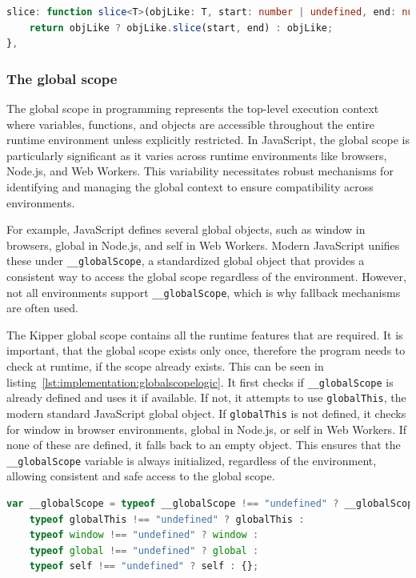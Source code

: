\begin{lstlisting}[language=TypeScript,caption=Slice in the target language TypeScript,label=lst:implementation:slicegenerated]
slice: function slice<T>(objLike: T, start: number | undefined, end: number | undefined): T {
	return objLike ? objLike.slice(start, end) : objLike;
},
\end{lstlisting}

\subsubsection{The global scope}

The global scope in programming represents the top-level execution context where variables, functions, and objects are accessible throughout the entire runtime environment unless explicitly restricted. In JavaScript, the global scope is particularly significant as it varies across runtime environments like browsers, Node.js, and Web Workers. This variability necessitates robust mechanisms for identifying and managing the global context to ensure compatibility across environments.

For example, JavaScript defines several global objects, such as window in browsers, global in Node.js, and self in Web Workers. Modern JavaScript unifies these under \lstinline|__globalScope|, a standardized global object that provides a consistent way to access the global scope regardless of the environment. However, not all environments support \lstinline|__globalScope|, which is why fallback mechanisms are often used.

The Kipper global scope contains all the runtime features that are required. It is important, that the global scope exists only once, therefore the program needs to check at runtime, if the scope already exists. This can be seen in listing~\ref{lst:implementation:globalscopelogic}. It first checks if \lstinline|__globalScope| is already defined and uses it if available. If not, it attempts to use \lstinline|globalThis|, the modern standard JavaScript global object. If \lstinline|globalThis| is not defined, it checks for window in browser environments, global in Node.js, or self in Web Workers. If none of these are defined, it falls back to an empty object. This ensures that the \lstinline|__globalScope| variable is always initialized, regardless of the environment, allowing consistent and safe access to the global scope.

\begin{lstlisting}[language=TypeScript,caption=Global Scope Logic,label=lst:implementation:globalscopelogic]
var __globalScope = typeof __globalScope !== "undefined" ? __globalScope :
    typeof globalThis !== "undefined" ? globalThis :
    typeof window !== "undefined" ? window :
    typeof global !== "undefined" ? global :
    typeof self !== "undefined" ? self : {};
\end{lstlisting}


